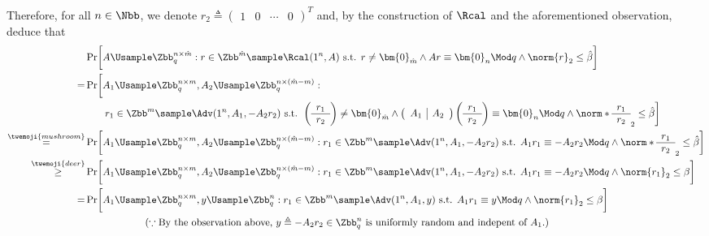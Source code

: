 \begin{answer}[ii]
    Therefore, for all $n\in\Nbb$, we denote $r_2\triangleq \begin{pmatrix}1 & 0 & \cdots & 0\end{pmatrix}^T$ and, by the construction of $\Rcal$ and the aforementioned observation, deduce that
    \begin{align*}
        &\Pr\biggl[A\Usample \Zbb_q^{n\times \hat m}: r\in\Zbb^{\hat m} \sample \Rcal(1^n, A) \textrm{ s.t. } r\neq \bm{0}_{\hat m} \land  Ar\equiv \bm{0}_{n}\Mod q \land \norm{r}_2\le \hat\beta \biggr]\\
        =& \Pr\biggl[A_1\Usample \Zbb_q^{n\times m}, A_2\Usample \Zbb_q^{n\times (\hat m-m)}:\\
        &\qquad  r_1\in\Zbb^{m} \sample \Adv(1^n, A_1, -A_2r_2) \textrm{ s.t. } \left(\begin{array}{c}r_1\\\hline r_2\end{array}\right)\neq \bm{0}_{\hat m} \land  \left(\begin{array}{c|c} A_1&A_2\end{array}\right)\left(\begin{array}{c}r_1\\\hline r_2\end{array}\right)\equiv \bm{0}_{n}\Mod q \land \norm*{\begin{array}{c}r_1\\\hline r_2\end{array}}_2\le \hat\beta \biggr]\\
        \stackrel{\twemoji{mushroom}}=& \Pr\biggl[A_1\Usample \Zbb_q^{n\times m}, A_2\Usample \Zbb_q^{n\times (\hat m-m)}:  r_1\in\Zbb^{m} \sample \Adv(1^n, A_1, -A_2r_2) \textrm{ s.t. } A_1r_1\equiv -A_2r_2 \Mod q \land \norm*{\begin{array}{c}r_1\\\hline r_2\end{array}}_2\le \hat\beta \biggr]\\
        \stackrel{\twemoji{deer}}\ge& \Pr\biggl[A_1\Usample \Zbb_q^{n\times m}, A_2\Usample \Zbb_q^{n\times (\hat m-m)}:  r_1\in\Zbb^{m} \sample \Adv(1^n, A_1, -A_2r_2) \textrm{ s.t. } A_1r_1\equiv -A_2r_2 \Mod q \land \norm{r_1}_2\le \beta \biggr]\\
        =& \Pr\biggl[A_1\Usample \Zbb_q^{n\times m}, y\Usample \Zbb_q^{n}:  r_1\in\Zbb^{m} \sample \Adv(1^n, A_1, y) \textrm{ s.t. } A_1r_1\equiv y \Mod q \land \norm{r_1}_2\le \beta \biggr]\\
        &\qquad\qquad\qquad (\because \textrm{By the observation above, } y\triangleq -A_2r_2\in \Zbb_q^{n} \textrm{ is uniformly random and indepent of } A_1.)\\

\end{align*}
\end{answer}
